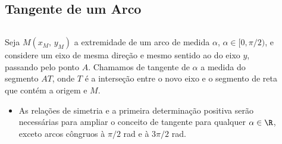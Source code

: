 \subsection{Tangente de um Arco}
\begin{frame}
  \begin{columns}[onlytextwidth]
    \begin{column}{0.49\textwidth}\vspace{-0.5cm}
      \begin{definition}[Tangente no 1ºQ]
        Seja $M(x_{M},\,y_{M})$ a extremidade de um arco de medida $\alpha$, $\alpha\in[0,\pi/2)$, e considere um eixo de mesma direção e mesmo sentido ao do eixo $y$, passando pelo ponto $A$. Chamamos de tangente de $\alpha$ a medida do segmento $AT$, onde $T$ é a interseção entre o novo eixo e o segmento de reta que contém a origem e $M$.
      \end{definition}
      \begin{highlight}
        \begin{itemize}
          \item As relações de simetria e a primeira determinação positiva serão necessárias para ampliar o conceito de tangente para qualquer $\alpha\in\R$, exceto arcos côngruos à $\pi/2$ rad e à $3\pi/2$ rad.
        \end{itemize}
      \end{highlight}
    \end{column}
    \begin{column}{0.49\textwidth}\vspace{-0.5cm}
      \begin{figure}
      \end{figure}
    \end{column}
  \end{columns}
\end{frame}

